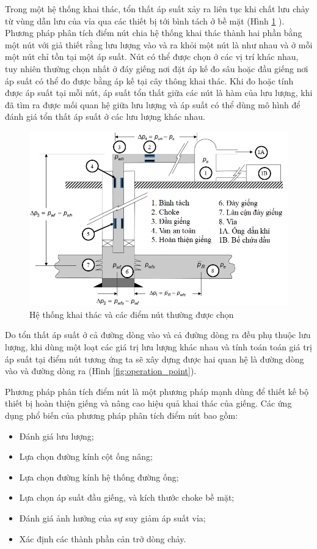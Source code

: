\documentclass[12pt,a4paper]{report}
\begin{document}
Trong một hệ thống khai thác, tổn thất áp suất xảy ra liên tục khi chất lưu chảy từ vùng dẫn lưu của vỉa qua các thiết bị tới bình tách ở bề mặt (Hình \ref{fig:nodal_system} \cite{dale1991production}). Phương pháp phân tích điểm nút chia hệ thống khai thác thành hai phần bằng một nút với giả thiết rằng lưu lượng vào và ra khỏi một nút là như nhau và ở mỗi một nút chỉ tồn tại một áp suất. Nút có thể được chọn ở các vị trí khác nhau, tuy nhiên thường chọn nhất ở đáy giếng nơi đặt áp kế đo sâu hoặc đầu giếng nơi áp suất có thể đo được bằng áp kế tại cây thông khai thác. Khi đo hoặc tính được áp suất tại mỗi nút, áp suất tổn thất giữa các nút là hàm của lưu lượng, khi đã tìm ra được mối quan hệ giữa lưu lượng và áp suất có thể dùng mô hình để đánh giá tổn thất áp suất ở các lưu lượng khác nhau.
	\begin{figure}[h]
		\centering
		\includegraphics[scale=0.7]{Fig/nodal_system.png}
		\caption{Hệ thống khai thác và các điểm nút thường được chọn}
		\label{fig:nodal_system}
	\end{figure}
\newline
Do tổn thất áp suất ở cả đường dòng vào và cả đường dòng ra đều phụ thuộc lưu lượng, khi dùng một loạt các giá trị lưu lượng khác nhau và tính toán toán giá trị áp suất tại điểm nút tương ứng ta sẽ xây dựng được hai quan hệ là đường dòng vào và đường dòng ra (Hình \ref{fig:operation_point}).

Phương pháp phân tích điểm nút là một phương pháp mạnh dùng để thiết kế bộ thiết bị hoàn thiện giếng và nâng cao hiệu quả khai thác của giếng. Các ứng dụng phổ biến của phương pháp phân tích điểm nút bao gồm:
	\begin{itemize}
		\item Đánh giá lưu lượng;
		\item Lựa chọn đường kính cột ống nâng;
		\item Lựa chọn đường kính hệ thống đường ống;
		\item Lựa chọn áp suất đầu giếng, và kích thước choke bề mặt;
		\item Đánh giá ảnh hưởng của sự suy giảm áp suất vỉa;
		\item Xác định các thành phần cản trở dòng chảy.
	\end{itemize}
\end{document}
